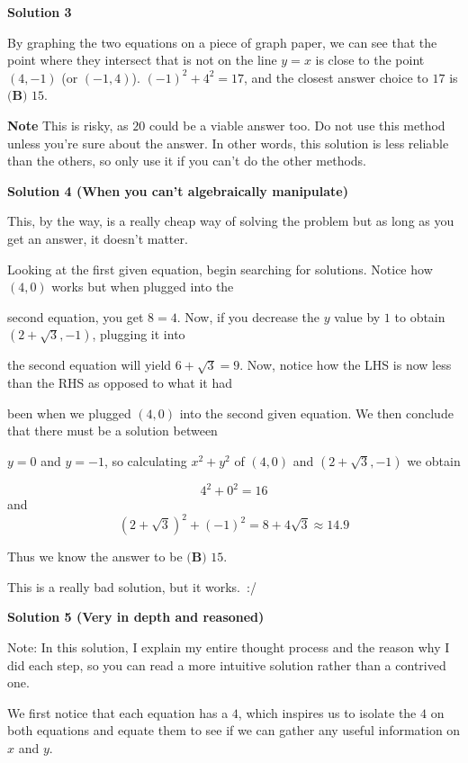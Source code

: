 \begin{enumerate}
 



\textbf{Solution 3}

By graphing the two equations on a piece of graph paper, we can see that the point where they intersect that is not on the line $y=x$ is close to the point $(4,-1)$ (or $(-1, 4)$). $(-1)^2+4^2=17$, and the closest answer choice to $17$ is $\boxed{\textbf{(B) } 15}$.

 \textbf{Note} This is risky, as $20$ could be a viable answer too. Do not use this method unless you're sure about the answer. In other words, this solution is less reliable than the others, so only use it if you can't do the other methods.

 



\textbf{Solution 4 (When you can't algebraically manipulate)}

This, by the way, is a really cheap way of solving the problem but as long as you get an answer, it doesn't matter.

 Looking at the first given equation, begin searching for solutions. Notice how $(4,0)$ works but when plugged into the

 second equation, you get $8=4$. Now, if you decrease the $y$ value by $1$ to obtain $(2+\sqrt3,-1)$, plugging it into 

 the second equation will yield $6+\sqrt3=9$. Now, notice how the LHS is now less than the RHS as opposed to what it had 

 been when we plugged $(4,0)$ into the second given equation. We then conclude that there must be a solution between 

 $y=0$ and $y=-1$, so calculating $x^2+y^2$ of $(4,0)$ and $(2+\sqrt3,-1)$ we obtain

 
 \[4^2+0^2=16\] and
 \[(2+\sqrt3)^2+(-1)^2=8+4\sqrt3\approx14.9\]

 Thus we know the answer to be $\boxed{\textbf{(B) } 15}$.

 This is a really bad solution, but it works. :/

 



\textbf{Solution 5 (Very in depth and reasoned)}

Note: In this solution, I explain my entire thought process and the reason why I did each step, so you can read a more intuitive solution rather than a contrived one.

 We first notice that each equation has a $4$, which inspires us to isolate the $4$ on both equations and equate them to see if we can gather any useful information on $x$ and $y.$ 


\end{enumerate}
